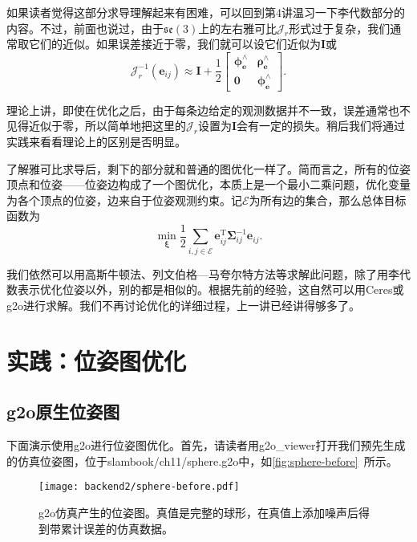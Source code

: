 如果读者觉得这部分求导理解起来有困难，可以回到第4讲温习一下李代数部分的内容。不过，前面也说过，由于$\mathfrak{se}(3)$上的左右雅可比$\bm{\mathcal{J}}_r$形式过于复杂，我们通常取它们的近似。如果误差接近于零，我们就可以设它们近似为$\bm{I}$或
\begin{equation}
\bm{\mathcal{J}}_r^{-1}(\bm{e}_{ij}) \approx \bm{I} + \frac{1}{2} 
\left[ 
{\begin{array}{*{20}{c}}
	{{\bm{\phi}_{\bm{e}} ^ \wedge }}&{{\bm{\rho}_{\bm{e}} ^ \wedge }}\\
	{\bm{0}}&{{\bm{\phi}_{\bm{e}} ^ \wedge }}
\end{array}} 
\right].
\end{equation}

理论上讲，即使在优化之后，由于每条边给定的观测数据并不一致，误差通常也不见得近似于零，所以简单地把这里的$\bm{\mathcal{J}}_r$设置为$\bm{I}$会有一定的损失。稍后我们将通过实践来看看理论上的区别是否明显。

了解雅可比求导后，剩下的部分就和普通的图优化一样了。简而言之，所有的位姿顶点和位姿——位姿边构成了一个图优化，本质上是一个最小二乘问题，优化变量为各个顶点的位姿，边来自于位姿观测约束。记$\mathcal{E}$为所有边的集合，那么总体目标函数为
\begin{equation}
\mathop {\min }\limits_{\bm{\xi}} \frac{1}{2}\sum\limits_{i,j \in \mathcal{E}} \bm{e}_{ij}^\mathrm{T} \bm{\Sigma}_{ij}^{-1} \bm{e}_{ij}.
\end{equation}

我们依然可以用高斯牛顿法、列文伯格—马夸尔特方法等求解此问题，除了用李代数表示优化位姿以外，别的都是相似的。根据先前的经验，这自然可以用Ceres或g2o进行求解。我们不再讨论优化的详细过程，上一讲已经讲得够多了。

\section{实践：位姿图优化}
\subsection{g2o原生位姿图}
下面演示使用g2o进行位姿图优化。首先，请读者用g2o\_viewer打开我们预先生成的仿真位姿图，位于slambook/ch11/sphere.g2o中，如\autoref{fig:sphere-before}~所示。

\begin{figure}[!htp]
	\centering
	\texttt{[image: backend2/sphere-before.pdf]}
	\caption{g2o仿真产生的位姿图。真值是完整的球形，在真值上添加噪声后得到带累计误差的仿真数据。}
	\label{fig:sphere-before}
\end{figure}

